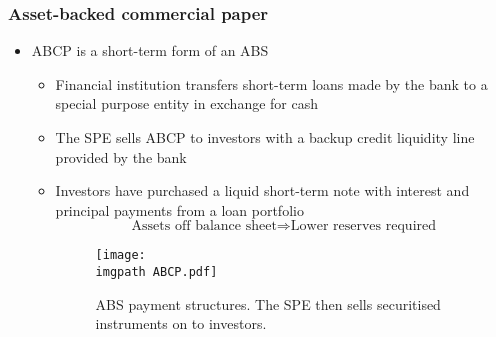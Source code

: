 \documentclass[../notes_compiled.tex]{subfiles}
\begin{document}
\subsubsection*{Asset-backed commercial paper}
\begin{itemize}
\item ABCP is a short-term form of an ABS
\begin{itemize}
\item Financial institution transfers short-term loans made by the bank to a special purpose entity in exchange for cash
\item The SPE sells ABCP to investors with a backup credit liquidity line provided by the bank
\item Investors have purchased a liquid short-term note with interest and principal payments from a loan portfolio
\begin{equation*}
\text{Assets off balance sheet} \Rightarrow \text{Lower reserves required}
\end{equation*}
\vspace{-1cm}
\begin{figure}[h!]
\centering
\texttt{[image: \\imgpath ABCP.pdf]}
\caption{ABS payment structures. The SPE then sells securitised instruments on to investors.}
\end{figure}
\end{itemize}
\end{itemize}
\end{document}
